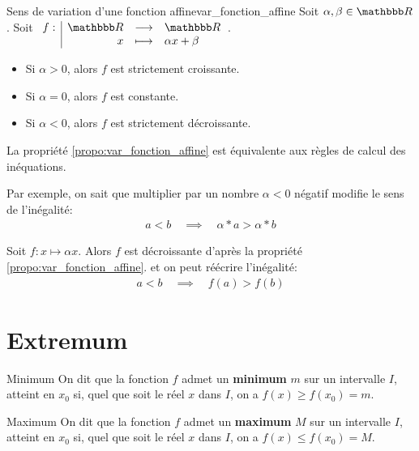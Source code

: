 \documentclass[10pt,a4paper,openany,twoside, eleve]{book}
\begin{document}
	\begin{prop}{Sens de variation d'une fonction affine}{var_fonction_affine}
		Soit $\alpha,\beta\in\R$. Soit $\fonction{f}{\R}{\R}{x}{\alpha x+\beta}$.

		\begin{itemize}
			\item Si $\alpha >0$, alors $f$ est strictement croissante.
			\item Si $\alpha =0$, alors $f$ est constante.
			\item Si $\alpha <0$, alors $f$ est strictement décroissante.
		\end{itemize}
	\end{prop}

	\begin{dem}{}{}
	\end{dem}

	\begin{rem}{}{}
		La propriété \ref{propo:var_fonction_affine} est équivalente aux règles de calcul des inéquations.

		Par exemple, on sait que multiplier par un nombre $\alpha<0$ négatif modifie le sens de l'inégalité:
		\begin{align*}
			a<b
			\quad \implies \quad \alpha * a > \alpha * b
		\end{align*}

		Soit $f:x\longmapsto \alpha x$. Alors $f$ est décroissante d'après la propriété \ref{propo:var_fonction_affine}. et on peut réécrire l'inégalité:
		\begin{align*}
			a<b
			\quad \implies \quad f(a) > f(b)
		\end{align*}

	\end{rem}

	\section{Extremum}

	\begin{defi}{Minimum}{}
	On dit que la fonction $f$ admet un \textbf{minimum} $m$ sur un intervalle $I$, atteint en $x_0$ si, quel que soit le réel $x$ dans $I$, on a $f(x) \ge f(x_0)=m$.
	\end{defi}

	\begin{defi}{Maximum}{}
	On dit que la fonction $f$ admet un \textbf{maximum} $M$ sur un intervalle $I$, atteint en $x_0$ si, quel que soit le réel $x$ dans $I$, on a $f(x) \le f(x_0)=M$.
	\end{defi}
\end{document}
